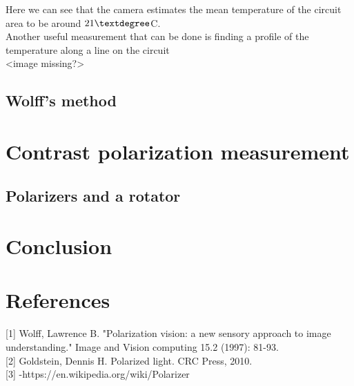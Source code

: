 \documentclass[english]{article}
\begin{document}
Here we can see that the camera estimates the mean temperature of the circuit area to be around $21 \textdegree$C.\\
Another useful measurement that can be done is finding a profile of the temperature along a line on the circuit\\
<image missing?>

\subsection{Wolff's method}


\section{Contrast polarization measurement}
\subsection{Polarizers and a rotator}
\section{Conclusion}

\section{References}
{[}1{]} Wolff, Lawrence B. "Polarization vision: a new sensory approach to image understanding." Image and Vision computing 15.2 (1997): 81-93.\\
{[}2{]} Goldstein, Dennis H. Polarized light. CRC Press, 2010.\\
{[}3{]} -https://en.wikipedia.org/wiki/Polarizer\\
\end{document}
